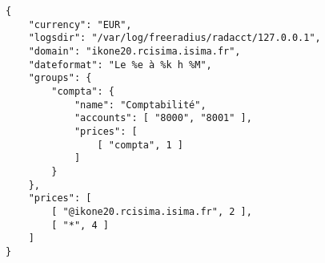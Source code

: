 
\begin{verbatim}
{
	"currency": "EUR",
	"logsdir": "/var/log/freeradius/radacct/127.0.0.1",
	"domain": "ikone20.rcisima.isima.fr",
	"dateformat": "Le %e à %k h %M",
	"groups": {
		"compta": {
			"name": "Comptabilité",
			"accounts": [ "8000", "8001" ],
			"prices": [
				[ "compta", 1 ]
			]
		}
	},
	"prices": [
		[ "@ikone20.rcisima.isima.fr", 2 ],
		[ "*", 4 ]
	]
}
\end{verbatim}
